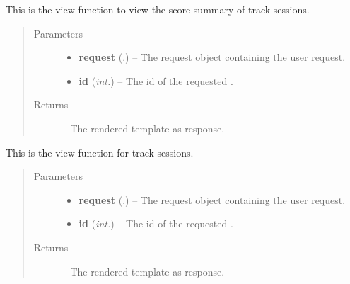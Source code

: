 \documentclass[letterpaper,10pt,english]{sphinxmanual}
\begin{document}
\begin{fulllineitems}
\label{Contour.contour:Contour.contour.views.session}
This is the view function to view the score summary of track sessions.
\begin{quote}\begin{description}
\item[{Parameters}] \leavevmode\begin{itemize}
\item {} 
\textbf{request} (.) -- The request object containing the user request.

\item {} 
\textbf{id} (\emph{int.}) -- The id of the requested {\hyperref[Contour.contour:Contour.contour.models.TrackSession]{}}.

\end{itemize}

\item[{Returns}] \leavevmode
{} -- The rendered template as response.

\end{description}\end{quote}

\end{fulllineitems}


\begin{fulllineitems}
\label{Contour.contour:Contour.contour.views.track}
This is the view function for track sessions.
\begin{quote}\begin{description}
\item[{Parameters}] \leavevmode\begin{itemize}
\item {} 
\textbf{request} (.) -- The request object containing the user request.

\item {} 
\textbf{id} (\emph{int.}) -- The id of the requested {\hyperref[Contour.contour:Contour.contour.models.Track]{}}.

\end{itemize}

\item[{Returns}] \leavevmode
{} -- The rendered template as response.

\end{description}\end{quote}

\end{fulllineitems}
\end{document}
